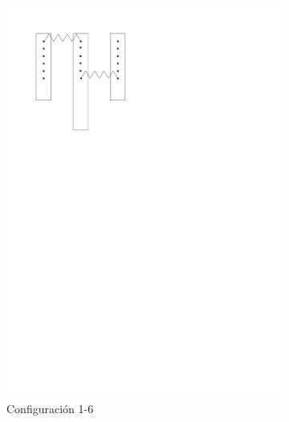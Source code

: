 \begin{figure}[htbp!]
\begin{subfigure}[b]{0.3\textwidth}
    \includegraphics[width=\linewidth]{./Figures/16.pdf}
    \caption{Configuraci\'on 1-6}
    \label{fig:conf-1-6}
  \end{subfigure}
  \hfill
  \begin{subfigure}[b]{0.3\textwidth}
    \centering

\end{subfigure}
\end{figure}
